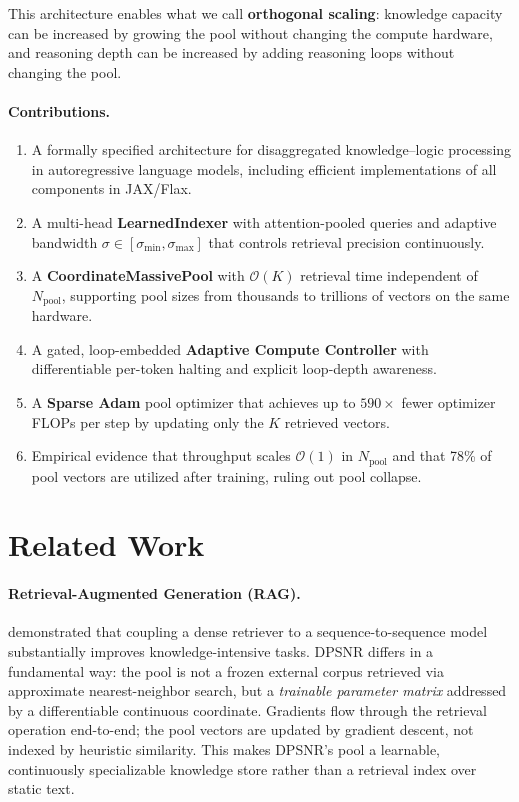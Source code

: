\documentclass[11pt]{article}
\begin{document}
This architecture enables what we call \textbf{orthogonal scaling}: knowledge
capacity can be increased by growing the pool without changing the compute
hardware, and reasoning depth can be increased by adding reasoning loops
without changing the pool.

\paragraph{Contributions.}
\begin{enumerate}[leftmargin=1.8em]
  \item A formally specified architecture for disaggregated knowledge–logic
        processing in autoregressive language models, including efficient
        implementations of all components in JAX/Flax.
  \item A multi-head \textbf{LearnedIndexer} with attention-pooled queries and
        adaptive bandwidth $\sigma \in [\sigma_{\min}, \sigma_{\max}]$ that
        controls retrieval precision continuously.
  \item A \textbf{CoordinateMassivePool} with $\mathcal{O}(K)$ retrieval time
        independent of $N_{\text{pool}}$, supporting pool sizes from thousands
        to trillions of vectors on the same hardware.
  \item A gated, loop-embedded \textbf{Adaptive Compute Controller} with
        differentiable per-token halting and explicit loop-depth awareness.
  \item A \textbf{Sparse Adam} pool optimizer that achieves up to $590\times$
        fewer optimizer FLOPs per step by updating only the $K$ retrieved
        vectors.
  \item Empirical evidence that throughput scales $\mathcal{O}(1)$ in
        $N_{\text{pool}}$ and that 78\% of pool vectors are utilized after
        training, ruling out pool collapse.
\end{enumerate}

\section{Related Work}
\label{sec:related}

\paragraph{Retrieval-Augmented Generation (RAG).}
\citet{lewis2020rag} demonstrated that coupling a dense retriever to a
sequence-to-sequence model substantially improves knowledge-intensive tasks.
DPSNR differs in a fundamental way: the pool is not a frozen external corpus
retrieved via approximate nearest-neighbor search, but a \emph{trainable
parameter matrix} addressed by a differentiable continuous coordinate.
Gradients flow through the retrieval operation end-to-end; the pool vectors
are updated by gradient descent, not indexed by heuristic similarity.
This makes DPSNR's pool a learnable, continuously specializable knowledge
store rather than a retrieval index over static text.
\end{document}
